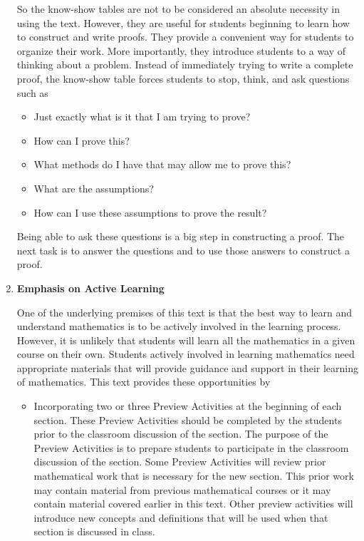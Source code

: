 \begin{enumerate}
So the know-show tables are not to be considered an absolute necessity in using the text.  However, they are useful for students beginning to learn how to construct and write proofs.  They provide a convenient way for students to organize their work.  More importantly, they introduce students to a way of thinking about a problem.  Instead of immediately trying to write a complete proof, the know-show table forces students to stop, think, and ask questions such as

\begin{itemize}
\item Just exactly what is it that I am trying to prove?
\item How can I prove this?
\item What methods do I have that may allow me to prove this?
\item What are the assumptions?
\item How can I use these assumptions to prove the result?
\end{itemize}

Being able to ask these questions is a big step in constructing a proof.  The next task is to answer the questions and to use those answers to construct a proof.


\item \textbf{Emphasis on Active Learning}

One of the underlying premises of this text is that the best way to learn and understand mathematics is to be actively involved in the learning process.  However, it is unlikely that  students will learn all the mathematics in a given course on their own.  Students actively involved in learning mathematics need appropriate materials that will provide guidance and support in their learning of mathematics.  This text provides these opportunities by
\begin{itemize}
\item Incorporating two or three Preview Activities at the beginning of each section.  These Preview Activities should be completed by the students prior to the classroom discussion of the section.  The purpose of the Preview Activities is to prepare students to participate in the classroom discussion of the section.  Some Preview Activities will review prior mathematical work that is necessary for the new section.  This prior work may contain material from previous mathematical courses or it may contain material covered earlier in this text.  Other preview activities will introduce new concepts and definitions that will be used when that section is discussed in class.


\end{itemize}
\end{enumerate}
